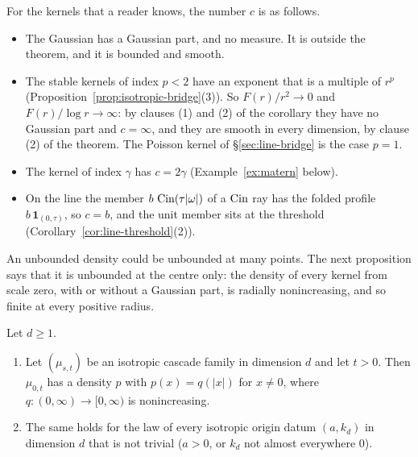 For the kernels that a reader knows, the number $c$ is as follows.
\begin{itemize}
\item The Gaussian has a Gaussian part, and no \Levy{} measure. It is outside the theorem, and
it is bounded and smooth.
\item The stable kernels of index $p < 2$ have an exponent that is a multiple of $r^p$
(Proposition~\ref{prop:isotropic-bridge}(3)). So $F(r)/r^2 \to 0$ and
$F(r)/\log r \to \infty$: by clauses (1) and (2) of the corollary they have no Gaussian part and
$c = \infty$, and they are smooth in every dimension, by clause (2) of the theorem. The Poisson
kernel of \S\ref{sec:line-bridge} is the case $p = 1$.
\item The \Matern{} kernel of index $\gamma$ has $c = 2\gamma$ (Example~\ref{ex:matern} below).
\item On the line the member $b\,\operatorname{Cin}(\tau|\omega|)$ of a $\operatorname{Cin}$ ray has the folded profile
$b\,\mathbf 1_{(0,\tau)}$, so $c = b$, and the unit member sits at the threshold
(Corollary~\ref{cor:line-threshold}(2)).
\end{itemize}

An unbounded density could be unbounded at many points. The next proposition says that it is
unbounded at the centre only: the density of every kernel from scale zero, with or without a
Gaussian part, is radially nonincreasing, and so finite at every positive radius.

\begin{proposition}\label{prop:isotropic-radial-monotone}
Let $d \ge 1$.
\begin{enumerate}
\item Let $(\mu_{s,t})$ be an isotropic cascade family in dimension $d$ and let $t > 0$. Then
$\mu_{0,t}$ has a density $p$ with $p(x) = q(|x|)$ for $x \ne 0$, where
$q : (0,\infty) \to [0,\infty)$ is nonincreasing.
\item The same holds for the law of every isotropic origin datum $(a,k_d)$ in dimension $d$ that is
not trivial ($a > 0$, or $k_d$ not almost everywhere $0$).
\end{enumerate}
\end{proposition}

